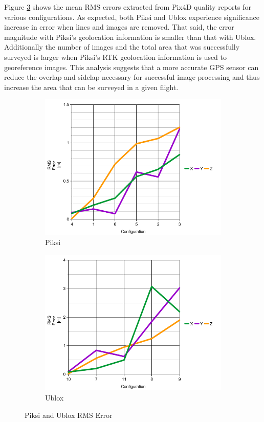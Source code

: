 \documentclass{article}
\begin{document}
Figure \ref{figure:rmserror} shows the mean RMS errors extracted from Pix4D quality reports for
various configurations.  As expected, both Piksi and Ublox experience significance increase in error
when lines and images are removed. That said, the error magnitude with Piksi's geolocation
information is smaller than that with Ublox. Additionally the number of images and the total area
that was successfully surveyed is larger when Piksi's RTK geolocation information is used to
georeference images. This analysis suggests that a more accurate GPS sensor can reduce the overlap
and sidelap necessary for successful image processing and thus increase the area that can be
surveyed in a given flight.


\begin{figure}
\centering
\begin{subfigure}{.5\textwidth}
  \centering
  \includegraphics[width=1\linewidth]{images/piksi_rms_error.png}
  \caption{Piksi}
  \label{fig:sub1}
\end{subfigure}%
\begin{subfigure}{.5\textwidth}
  \centering
  \includegraphics[width=1\linewidth]{images/ublox_rms_error.png}
  \caption{Ublox}
  \label{fig:sub2}
\end{subfigure}%
\caption{Piksi and Ublox RMS Error }
\label{figure:rmserror}
\end{figure}
\end{document}
